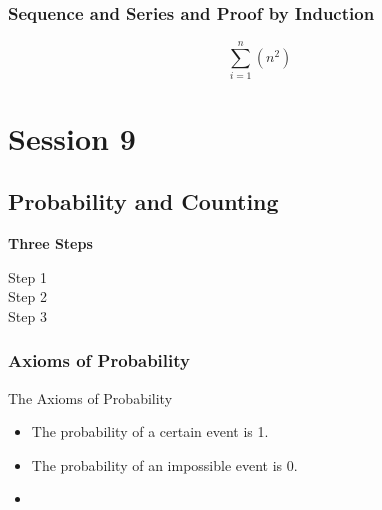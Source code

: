 



\subsection{Sequence and Series and Proof by Induction}


\[\sum^{n}_{i=1} (n^2) \]








\newpage
\chapter{Session 9}
\section{Probability and Counting}
\newpage

\textbf{Three Steps}
\begin{description}
\item[Step 1]
\item[Step 2]
\item[Step 3]
\end{description}







\subsection{Axioms of Probability}

The Axioms of Probability

\begin{itemize}
\item The probability of a certain event is 1.
\item The probability of an impossible event is 0.
\item 
\end{itemize}
